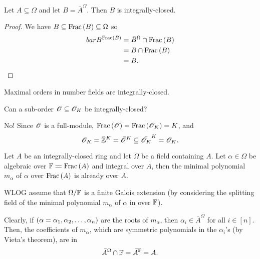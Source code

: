 \documentclass[11pt]{article}
\begin{document}
\begin{proposition}
Let $A \subseteq \Omega$ and let $B = \bar{A}^{\Omega}$. Then $B$ is integrally-closed. 
\end{proposition}

\begin{proof}
We have
$B \subseteq \operatorname{Frac}\left( B \right) \subseteq \Omega$ so
\begin{align*}
bar{B}^{\operatorname{Frac}\left( B \right)} &= \bar{B}^{\Omega} \cap \operatorname{Frac}\left( B \right)
\\&= B \cap \operatorname{Frac}\left( B \right)
\\&= B \text{.}
\end{align*}
\end{proof}

\begin{corollary}
Maximal orders in number fields are integrally-closed.
\end{corollary}

\begin{question*}
Can a sub-order $\mathcal{O} \subseteq \mathcal{O}_K$ be integrally-closed?
\end{question*}

\begin{answer*}
No! Since $\mathcal{O}$ is a full-module, $\operatorname{Frac}\left( \mathcal{O} \right) = \operatorname{Frac}\left( \mathcal{O}_K \right) = K$,
and
\[\mathcal{O}_K = \bar{\mathbb{Z}}^K = \bar{\mathcal{O}}^K \subseteq \bar{\mathcal{O}_K}^K = \mathcal{O}_K \text{.}\]
\end{answer*}

\begin{exercise}
Let $A$ be an integrally-closed ring and let $\Omega$ be a field containing $A$. Let $\alpha \in \Omega$ be algebraic over $\mathbb{F} \coloneqq \operatorname{Frac}\left( A \right)$ and integral over $A$, then the minimal polynomial $m_\alpha$ of $\alpha$ over $\operatorname{Frac}\left( A \right)$ is already over $A$.
\end{exercise}

\begin{solution}
WLOG assume that $\Omega / \mathbb{F}$ is a finite Galois extension (by considering the splitting field of the minimal polynomial $m_{\alpha}$ of $\alpha$ in over $\mathbb{F}$).

Clearly, if $\left( \alpha = \alpha_1, \alpha_2, \ldots, \alpha_n \right)$ are the roots of $m_\alpha$, then $\alpha_i \in \bar{A}^{\Omega}$ for all $i \in [n]$. Then, the coefficients of $m_\alpha$, which are symmetric polynomials in the $\alpha_i$'s (by Vieta's theorem), are in \[\bar{A}^{\Omega} \cap \mathbb{F} = \bar{A}^{\mathbb{F}} = A \text{.}\]  
\end{solution}
\end{document}
